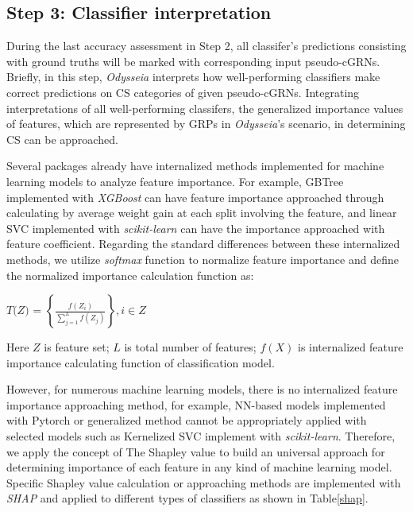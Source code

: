 \documentclass[fleqn,10pt]{wlscirep}
\begin{document}
\subsection*{Step 3: Classifier interpretation}
\label{step3}
During the last accuracy assessment in Step 2, all classifer's predictions consisting with ground truths will be marked with corresponding input pseudo-cGRNs.
Briefly, in this step, \emph{Odysseia} interprets how well-performing classifiers make correct predictions on CS categories of given pseudo-cGRNs.
Integrating interpretations of all well-performing classifers, the generalized importance values of features, which are represented by GRPs in \emph{Odysseia}'s scenario, in determining CS can be approached.

Several packages already have internalized methods implemented for machine learning models to analyze feature importance.
For example, GBTree implemented with \emph{XGBoost}\cite{chen2016xgboost} can have feature importance approached through calculating by average weight gain at each split involving the feature, and linear SVC implemented with \emph{scikit-learn}\cite{scikit-learn} can have the importance approached with feature coefficient.
Regarding the standard differences between these internalized methods, we utilize \emph{softmax} function to normalize feature importance and define the normalized importance calculation function as:

\centerline{$\textit{T(Z) = }\left\{\frac{f(Z_i)}{\sum_{j = 1}^{L} f(Z_j)}\right\}, i \in Z$}

\noindent Here $Z$ is feature set; $L$ is total number of features; $f(X)$ is internalized  feature importance calculating function of classification model.\

However, for numerous machine learning models, there is no internalized feature importance approaching method, for example, NN-based models implemented with Pytorch\cite{NEURIPS2019_9015} or generalized method cannot be appropriately applied with selected models such as Kernelized SVC implement with \emph{scikit-learn}\cite{scikit-learn}.
Therefore, we apply the concept of The Shapley value\cite{roth_1988} to build an universal approach for determining importance of each feature in any kind of machine learning model.
Specific Shapley value calculation or approaching methods are implemented with \emph{SHAP}\cite{lundberg2017unified} and applied to different types of classifiers as shown in Table\ref{shap}.
\end{document}
